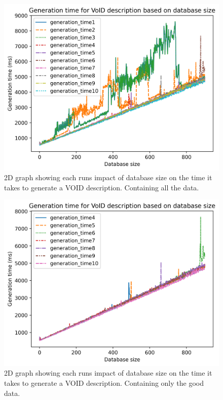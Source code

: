 \begin{figure}
    \centering
    \includegraphics[width=0.8\columnwidth]{figures/generation-results-graph-all.png}
    \caption{2D graph showing each runs impact of database size on the time it takes to generate a VOID description. Containing all the data.}
    \label{fig:generate-dbsize-10-runs-all}
\end{figure}

\begin{figure}
    \centering
    \includegraphics[width=0.8\columnwidth]{figures/generation-results-graph-all-good.png}
    \caption{2D graph showing each runs impact of database size on the time it takes to generate a VOID description. Containing only the good data.}
    \label{fig:generate-dbsize-10-runs-good}
\end{figure}